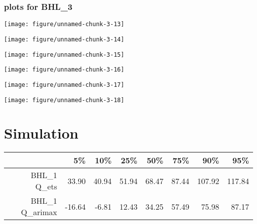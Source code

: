 \documentclass[10pt,a4paper]{article}\usepackage[]{graphicx}\usepackage[]{color}
\makeatletter
\def\maxwidth{ %
  \ifdim\Gin@nat@width>\linewidth
    \linewidth
  \else
    \Gin@nat@width
  \fi
}
\newenvironment{kframe}{%
 \def\at@end@of@kframe{}%
 \ifinner\ifhmode%
  \def\at@end@of@kframe{\end{minipage}}%
  \begin{minipage}{\columnwidth}%
 \fi\fi%
 \def\FrameCommand##1{\hskip\@totalleftmargin \hskip-\fboxsep
 \colorbox{shadecolor}{##1}\hskip-\fboxsep
     \hskip-\linewidth \hskip-\@totalleftmargin \hskip\columnwidth}%
 \MakeFramed {\advance\hsize-\width
   \@totalleftmargin\z@ \linewidth\hsize
   \@setminipage}}%
 {\par\unskip\endMakeFramed%
 \at@end@of@kframe}
\newcommand{\AaA}{\_}
\makeatother
\begin{document}
\subsubsection{plots for BHL\AaA 3}

\texttt{[image: figure/unnamed-chunk-3-13]} 

\newpage

\texttt{[image: figure/unnamed-chunk-3-14]} 

\newpage

\texttt{[image: figure/unnamed-chunk-3-15]} 

\newpage

\texttt{[image: figure/unnamed-chunk-3-16]} 

\newpage

\texttt{[image: figure/unnamed-chunk-3-17]} 

\newpage

\texttt{[image: figure/unnamed-chunk-3-18]} 

\newpage


\section{Simulation}


\begin{kframe}


{\ttfamily\noindent\bfseries\color{errorcolor}{\#\# Error in Simulations[[j]]: subscript out of bounds}}\end{kframe}%
\begin{table}[ht]
\centering
\begin{tabular}{rrrrrrrr}
  \hline
 & 5\% & 10\% & 25\% & 50\% & 75\% & 90\% & 95\% \\ 
  \hline
BHL\_1 Q\_ets & 33.90 & 40.94 & 51.94 & 68.47 & 87.44 & 107.92 & 117.84 \\ 
  BHL\_1 Q\_arimax & -16.64 & -6.81 & 12.43 & 34.25 & 57.49 & 75.98 & 87.17 \\ 
   \hline
\end{tabular}
\end{table}
\end{document}
